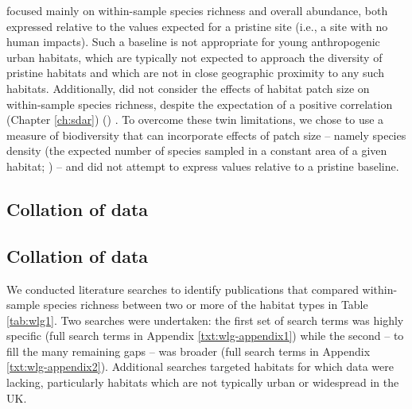 \cite{Newbold:2015nat} focused mainly on within-sample species richness and overall abundance, both expressed relative to the values expected for a pristine site (i.e., a site with no human impacts). Such a baseline is not appropriate for young anthropogenic urban habitats, which are typically not expected to approach the diversity of pristine habitats and which are not in close geographic proximity to any such habitats. Additionally, \cite{Newbold:2015nat} did not consider the effects of habitat patch size on within-sample species richness, despite the expectation of a positive correlation 
\ifappendixStyle %
(Chapter \ref{ch:sdar})%
\else
(\citealt{Phillips:2015sdar})
\fi
. To overcome these twin limitations, we chose to use a measure of biodiversity that can incorporate effects of patch size -- namely species density (the expected number of species sampled in a constant area of a given habitat; \citealt{Whittaker:2001uz,Magurran:2004tn}) -- and did not attempt to express values relative to a pristine baseline.

\ifappendixStyle %
\subsection{Collation of data}%
\else
\subsection*{Collation of data}
\fi

We conducted literature searches to identify publications that compared within-sample species richness between two or more of the habitat types in Table \ref{tab:wlg1}. Two searches were undertaken: the first set of search terms was highly specific (full search terms in Appendix \ref{txt:wlg-appendix1}) while the second -- to fill the many remaining gaps -- was broader (full search terms in Appendix \ref{txt:wlg-appendix2}). Additional searches targeted habitats for which data were lacking, particularly habitats which are not typically urban or widespread in the UK.

